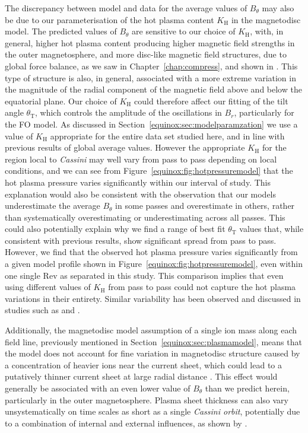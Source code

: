 The discrepancy between model and data for the average values of $B_{\theta}$ may also be due to our parameterisation of the hot plasma content $K_\mathrm{H}$ in the magnetodisc model. The predicted values of $B_{\theta}$ are sensitive to our choice of $K_\mathrm{H}$, with, in general, higher hot plasma content producing higher magnetic field strengths in the outer magnetosphere, and more disc-like magnetic field structures, due to global force balance, as we saw in Chapter~\ref{chap:compress}, and shown in \citet{achilleos2010b}. This type of structure is also, in general, associated with a more extreme variation in the magnitude of the radial component of the magnetic field above and below the equatorial plane. Our choice of $K_\mathrm{H}$ could therefore affect our fitting of the tilt angle $\theta_\mathrm{T}$, which controls the amplitude of the oscillations in $B_r$, particularly for the FO model. As discussed in Section~\ref{equinox:sec:modelparamzation} we use a value of $K_\mathrm{H}$ appropriate for the entire data set studied here, and in line with previous results of global average values. However the appropriate $K_\mathrm{H}$ for the region local to \textit{Cassini} may well vary from pass to pass depending on local conditions, and we can see from Figure~\ref{equinox:fig:hotpressuremodel} that the hot plasma pressure varies significantly within our interval of study. This explanation would also be consistent with the observation that our models underestimate the average $B_{\theta}$ in some passes and overestimate in others, rather than systematically overestimating or underestimating across all passes. This could also potentially explain why we find a range of best fit $\theta_\mathrm{T}$ values that, while consistent with previous results, show significant spread from pass to pass. However, we find that the observed hot plasma pressure varies significantly from a given model profile shown in Figure~\ref{equinox:fig:hotpressuremodel}, even within one single Rev as separated in this study. This comparison implies that even using different values of $K_\mathrm{H}$ from pass to pass could not capture the hot plasma variations in their entirety. Similar variability has been observed and discussed in studies such as \citet{sergis2007} and \citet{kellett2010}.

Additionally, the magnetodisc model assumption of a single ion mass along each field line, previously mentioned in Section~\ref{equinox:sec:plasmamodel}, means that the model does not account for fine variation in magnetodisc structure caused by a concentration of heavier ions near the current sheet, which could lead to a putatively thinner current sheet at large radial distance \citep{nemeth2011}. This effect would generally be associated with an even lower value of $B_{\theta}$ than we predict herein, particularly in the outer magnetosphere. Plasma sheet thickness can also vary unsystematically on time scales as short as a single \textit{Cassini orbit}, potentially due to a combination of internal and external influences, as shown by \citet{sergis2011}.

